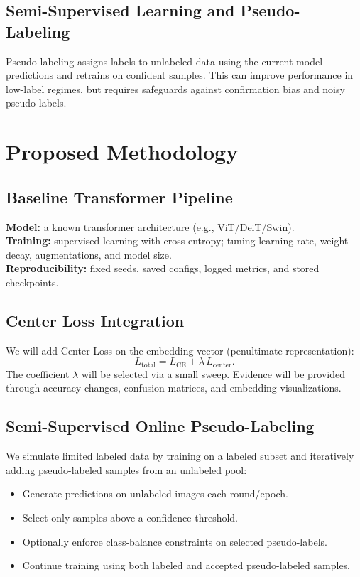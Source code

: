 \documentclass[english]{teza-upb_en}
\begin{document}
\section{Semi-Supervised Learning and Pseudo-Labeling}
Pseudo-labeling assigns labels to unlabeled data using the current model predictions and retrains on confident samples.
This can improve performance in low-label regimes, but requires safeguards against confirmation bias and noisy pseudo-labels.

\chapter{Proposed Methodology}

\section{Baseline Transformer Pipeline}
\textbf{Model:} a known transformer architecture (e.g., ViT/DeiT/Swin).\\
\textbf{Training:} supervised learning with cross-entropy; tuning learning rate, weight decay, augmentations, and model size.\\
\textbf{Reproducibility:} fixed seeds, saved configs, logged metrics, and stored checkpoints.

\section{Center Loss Integration}
We will add Center Loss on the embedding vector (penultimate representation):
\[
L_{\text{total}} = L_{\text{CE}} + \lambda \, L_{\text{center}}.
\]
The coefficient $\lambda$ will be selected via a small sweep.
Evidence will be provided through accuracy changes, confusion matrices, and embedding visualizations.

\section{Semi-Supervised Online Pseudo-Labeling}
We simulate limited labeled data by training on a labeled subset and iteratively adding pseudo-labeled samples from an unlabeled pool:
\begin{itemize}
  \item Generate predictions on unlabeled images each round/epoch.
  \item Select only samples above a confidence threshold.
  \item Optionally enforce class-balance constraints on selected pseudo-labels.
  \item Continue training using both labeled and accepted pseudo-labeled samples.
\end{itemize}
\end{document}
